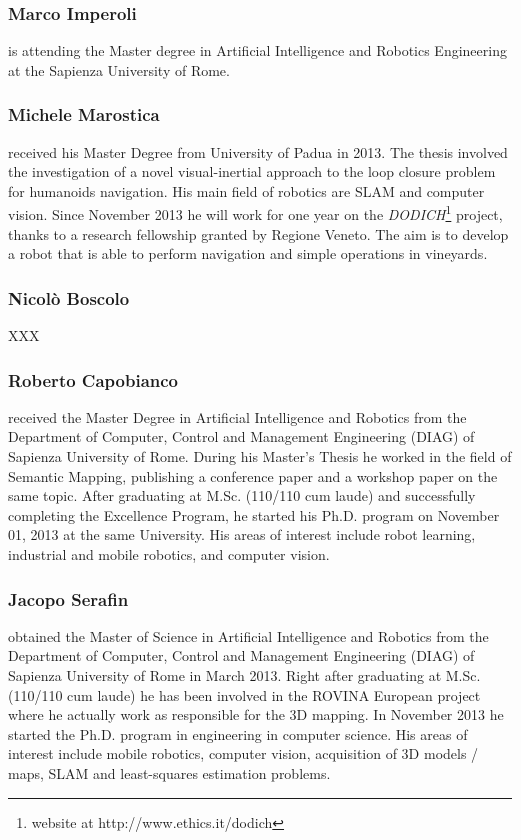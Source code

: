 \documentclass[conference]{IEEEtran}
\begin{document}
\subsubsection{Marco Imperoli}
is attending the Master degree in Artificial Intelligence and Robotics Engineering at the Sapienza University of Rome.
\subsubsection{Michele Marostica}
received his Master Degree from University of Padua in 2013. The thesis involved the investigation of a novel visual-inertial approach to the loop closure problem for humanoids navigation. His main field of robotics are SLAM and computer vision.
Since November 2013 he will work for one year on the \textit{DODICH}\footnote{website at http://www.ethics.it/dodich} project, thanks to a research fellowship granted by Regione Veneto.
The aim is to develop a robot that is able to perform navigation and simple operations in vineyards.
\subsubsection{Nicolò Boscolo}
XXX
\subsubsection{Roberto Capobianco}
received the Master Degree in Artificial Intelligence and Robotics from the Department of Computer, 
Control and Management Engineering (DIAG) of Sapienza University of Rome. During his Master's Thesis he worked in the field of Semantic Mapping, publishing a conference paper and a workshop paper on the same topic. After graduating at M.Sc. (110/110 cum laude) and successfully completing the Excellence Program, he started his Ph.D. program on November 01, 2013 at the same University. His areas of interest include robot learning, industrial and mobile robotics, and computer vision.
\subsubsection{Jacopo Serafin}
obtained the Master of Science in Artificial Intelligence and Robotics from the Department of Computer, Control and Management Engineering (DIAG) of Sapienza University of Rome in March 2013. Right after graduating at M.Sc.(110/110 cum laude) he has been involved in the ROVINA European project where he actually work as responsible for the 3D mapping. In November 2013 he started the Ph.D. program in engineering in computer science. His areas of interest include mobile robotics, computer vision, acquisition of 3D models / maps, SLAM and least-squares estimation problems.
\end{document}
